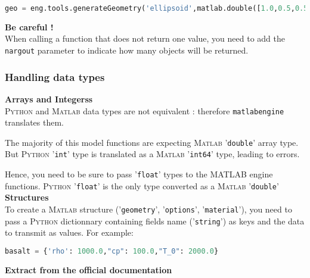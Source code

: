 \begin{lstlisting}[language=Python]
geo = eng.tools.generateGeometry('ellipsoid',matlab.double([1.0,0.5,0.5]),3.0,0.1,0.3)
\end{lstlisting}

\medskip 

\textbf{Be careful !}\\

When calling a function that does not return one value, you need to add the {\tt nargout} parameter to indicate how many objects will be returned.

\subsubsection{Handling data types}

\textbf{Arrays and Integerss}\\

\textsc{Python} and \textsc{Matlab} data types are not equivalent : therefore {\tt matlabengine} translates them.

The majority of this model functions are expecting \textsc{Matlab} '{\tt double}' array type. But \textsc{Python} '{\tt int}' type is translated as a \textsc{Matlab} '{\tt int64}' type, leading to errors.

Hence, you need to be sure to pass '{\tt float}' types to the MATLAB engine functions. \textsc{Python} '{\tt float}' is the only type converted as a \textsc{Matlab} '{\tt double}'\\

\textbf{Structures}\\

To create a \textsc{Matlab} structure ('{\tt geometry}', '{\tt options}', '{\tt material}'), you need to pass a \textsc{Python} dictionnary containing fields name ('{\tt string}') as keys and the data to transmit as values. For example:

\begin{lstlisting}[language=Python]
basalt = {'rho': 1000.0,"cp": 100.0,"T_0": 2000.0}
\end{lstlisting}

\textbf{Extract from the official documentation}\\

